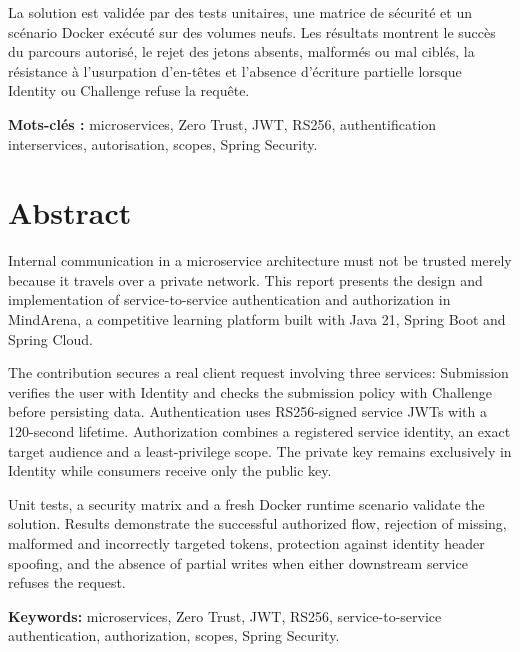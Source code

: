 \documentclass[12pt,a4paper,oneside]{report}
\begin{document}
La solution est validée par des tests unitaires, une matrice de sécurité et un
scénario Docker exécuté sur des volumes neufs. Les résultats montrent le succès
du parcours autorisé, le rejet des jetons absents, malformés ou mal ciblés, la
résistance à l'usurpation d'en-têtes et l'absence d'écriture partielle lorsque
Identity ou Challenge refuse la requête.

\noindent\textbf{Mots-clés :} microservices, Zero Trust, JWT, RS256,
authentification interservices, autorisation, scopes, Spring Security.

\chapter*{Abstract}
Internal communication in a microservice architecture must not be trusted merely
because it travels over a private network. This report presents the design and
implementation of service-to-service authentication and authorization in
MindArena, a competitive learning platform built with Java 21, Spring Boot and
Spring Cloud.

The contribution secures a real client request involving three services:
Submission verifies the user with Identity and checks the submission policy with
Challenge before persisting data. Authentication uses RS256-signed service JWTs
with a 120-second lifetime. Authorization combines a registered service identity,
an exact target audience and a least-privilege scope. The private key remains
exclusively in Identity while consumers receive only the public key.

Unit tests, a security matrix and a fresh Docker runtime scenario validate the
solution. Results demonstrate the successful authorized flow, rejection of
missing, malformed and incorrectly targeted tokens, protection against identity
header spoofing, and the absence of partial writes when either downstream service
refuses the request.

\noindent\textbf{Keywords:} microservices, Zero Trust, JWT, RS256,
service-to-service authentication, authorization, scopes, Spring Security.
\end{document}
